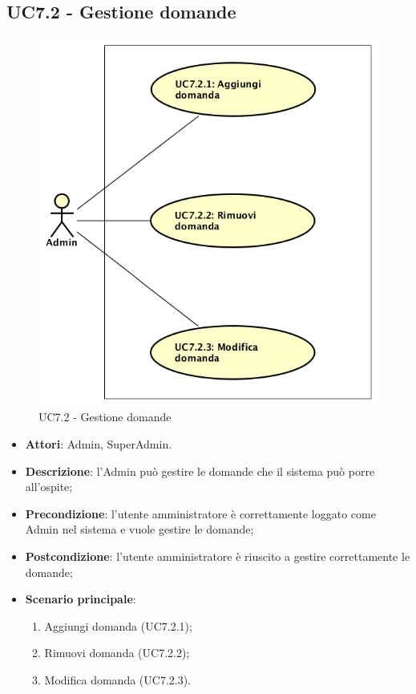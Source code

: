 \documentclass[../AnalisiDeiRequisiti_v4.0.0.tex]{subfiles}
\begin{document}
\subsection{UC7.2 - Gestione domande} 
\label{sssec:UC7.2} 
\begin{figure}[!h]
	\centering
	\includegraphics[width=\textwidth]{UseCases/UC7_GestionePannelloAdmin/UC7_2_GestioneDomande/UC7_2_GestioneDomande.png}
	\caption{UC7.2 - Gestione domande}
\end{figure}
\begin{itemize} 
\item \textbf{Attori}: Admin, SuperAdmin.
\item \textbf{Descrizione}: l'Admin può gestire le domande che il sistema può porre all'ospite;
\item \textbf{Precondizione}: l'utente amministratore è correttamente loggato come Admin nel sistema e vuole gestire le domande;
\item \textbf{Postcondizione}: l'utente amministratore è riuscito a gestire correttamente le domande;
\item \textbf{Scenario principale}: \begin{enumerate}\item Aggiungi domanda (UC7.2.1);\item Rimuovi domanda (UC7.2.2);\item Modifica domanda (UC7.2.3).
\end{enumerate}
\end{itemize} 
\end{document}
